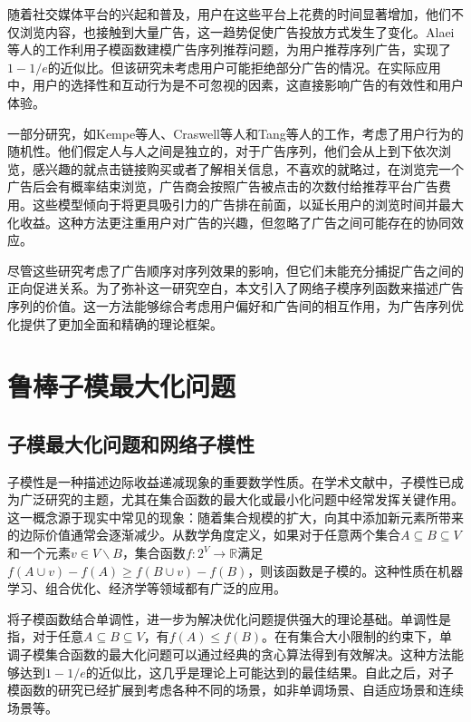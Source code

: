 随着社交媒体平台的兴起和普及，用户在这些平台上花费的时间显著增加，他们不仅浏览内容，也接触到大量广告，这一趋势促使广告投放方式发生了变化。Alaei等人\cite{alaei2021maximizing}的工作利用子模函数建模广告序列推荐问题，为用户推荐序列广告，实现了$1-1/e$的近似比。但该研究未考虑用户可能拒绝部分广告的情况。在实际应用中，用户的选择性和互动行为是不可忽视的因素，这直接影响广告的有效性和用户体验。

一部分研究，如Kempe等人\cite{kempe2008cascade}、Craswell等人\cite{craswell2008experimental}和Tang等人\cite{tang2017robust}的工作，考虑了用户行为的随机性。他们假定人与人之间是独立的，对于广告序列，他们会从上到下依次浏览，感兴趣的就点击链接购买或者了解相关信息，不喜欢的就略过，在浏览完一个广告后会有概率结束浏览，广告商会按照广告被点击的次数付给推荐平台广告费用。这些模型倾向于将更具吸引力的广告排在前面，以延长用户的浏览时间并最大化收益。这种方法更注重用户对广告的兴趣，但忽略了广告之间可能存在的协同效应。

尽管这些研究考虑了广告顺序对序列效果的影响，但它们未能充分捕捉广告之间的正向促进关系。为了弥补这一研究空白，本文引入了网络子模序列函数来描述广告序列的价值。这一方法能够综合考虑用户偏好和广告间的相互作用，为广告序列优化提供了更加全面和精确的理论框架。

\section{鲁棒子模最大化问题}
\label{sec:2_2}

\subsection{子模最大化问题和网络子模性}

子模性是一种描述边际收益递减现象的重要数学性质。在学术文献中，子模性已成为广泛研究的主题，尤其在集合函数的最大化或最小化问题中经常发挥关键作用\cite{nemhauser1978best,khuller1999budgeted}。这一概念源于现实中常见的现象：随着集合规模的扩大，向其中添加新元素所带来的边际价值通常会逐渐减少。从数学角度定义，如果对于任意两个集合$A\subseteq B \subseteq V$和一个元素$v\in V\backslash B$，集合函数$f: 2^V \to \mathbb{R}$满足$f(A\cup v) - f(A) \ge f(B\cup v) -f(B)$，则该函数是子模的。这种性质在机器学习、组合优化、经济学等领域都有广泛的应用\cite{krause2005near,lin2011class,shi2021profit,kirchhoff2014submodularity,gabillon2013adaptive,kempe2003maximizing,wang2021efficient}。

将子模函数结合单调性，进一步为解决优化问题提供强大的理论基础。单调性是指，对于任意$A\subseteq B\subseteq V$，有$f(A)\le f(B)$。在有集合大小限制的约束下，单调子模集合函数的最大化问题可以通过经典的贪心算法得到有效解决。这种方法能够达到$1-1/e$的近似比\cite{nemhauser1978best}，这几乎是理论上可能达到的最佳结果。自此之后，对子模函数的研究已经扩展到考虑各种不同的场景，如非单调场景、自适应场景和连续场景等\cite{feige2007maximizing,golovin2011adaptive,das2011submodular,bach2019submodular,shi2019adaptive}。

